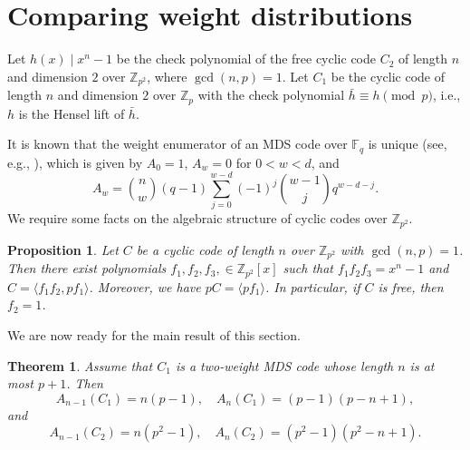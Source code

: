 \documentclass[12pt,reqno]{amsart}
\newtheorem{thm}{Theorem}
\newtheorem{prop}{Proposition}
\begin{document}
\section{Comparing weight distributions}

Let $h(x) \mid x^n-1$ be the check polynomial of the free cyclic code $C_2$ of length $n$ and dimension $2$ over $\mathbb{Z}_{p^2}$, where $\gcd(n,p)=1$.
Let $C_1$ be the cyclic code of length $n$ and dimension $2$ over $\mathbb{Z}_p$ with the check polynomial $\bar{h} \equiv h \pmod{p}$, i.e., $h$ is the Hensel lift of $\bar{h}$.

It is known that the weight enumerator of an MDS code over $\mathbb{F}_q$ is unique (see, e.g., \cite[12, Ch.11, \S 3, Theorem 6]{MacSlo}), which is given by $A_0 = 1$, $A_w = 0$ for $0 < w < d$, and
\[
A_w = \binom{n}{w} (q-1) \sum_{j=0}^{w-d} (-1)^j \binom{w-1}{j} q^{w-d-j}.
\]
We require some facts on the algebraic structure of cyclic codes over $\mathbb{Z}_{p^2}.$
\begin{prop}\cite[Proposition 2]{WS-DM}
	Let $C$ be a cyclic code of length $n$ over $\mathbb{Z}_{p^2}$ with $\gcd(n,p) = 1$.
	Then there exist polynomials $f_1, f_2, f_3, \in \mathbb{Z}_{p^2}[x]$ such that $f_1 f_2 f_3 = x^n-1$ and $C = \langle f_1 f_2, pf_1 \rangle$.
	Moreover, we have $pC = \langle pf_1 \rangle$.
	In particular, if $C$ is free, then $f_2 = 1$.
\end{prop}
 We are now ready for the main result of this section.
\begin{thm} \label{thm-wd}
	Assume that $C_1$ is a two-weight MDS code whose length $n$ is at most $p+1$.
	Then
	\[ A_{n-1}(C_1) = n(p-1), \quad A_n(C_1) = (p-1)(p-n+1), \]
	and
	\[ A_{n-1}(C_2) = n(p^2-1), \quad A_n(C_2) = (p^2 - 1)(p^2 - n+1). \]
\end{thm}
\end{document}

